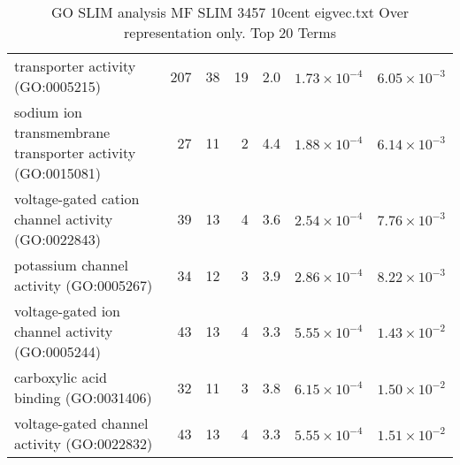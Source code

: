 \begin{table}[ht]
\begin{adjustbox}{width=\textwidth}
\begin{tabular}{lrrrrrr}
  transporter activity (GO:0005215) & 207 & 38 & 19 & 2.0 & $1.73 \times 10^{-4}$ & $6.05 \times 10^{-3}$ \\ 
  sodium ion transmembrane transporter activity (GO:0015081) & 27 & 11 & 2 & 4.4 & $1.88 \times 10^{-4}$ & $6.14 \times 10^{-3}$ \\ 
  voltage-gated cation channel activity (GO:0022843) & 39 & 13 & 4 & 3.6 & $2.54 \times 10^{-4}$ & $7.76 \times 10^{-3}$ \\ 
  potassium channel activity (GO:0005267) & 34 & 12 & 3 & 3.9 & $2.86 \times 10^{-4}$ & $8.22 \times 10^{-3}$ \\ 
  voltage-gated ion channel activity (GO:0005244) & 43 & 13 & 4 & 3.3 & $5.55 \times 10^{-4}$ & $1.43 \times 10^{-2}$ \\ 
  carboxylic acid binding (GO:0031406) & 32 & 11 & 3 & 3.8 & $6.15 \times 10^{-4}$ & $1.50 \times 10^{-2}$ \\ 
  voltage-gated channel activity (GO:0022832) & 43 & 13 & 4 & 3.3 & $5.55 \times 10^{-4}$ & $1.51 \times 10^{-2}$ \\ 
   \hline
\end{tabular}
\end{adjustbox}
\caption{GO SLIM analysis MF SLIM 3457 10cent eigvec.txt Over representation only. Top 20 Terms} 
\label{tab:GO SLIM analysis MF SLIM 3457 10cent eigvec.txt Over representation only. Top 20 Terms}
\end{table}

